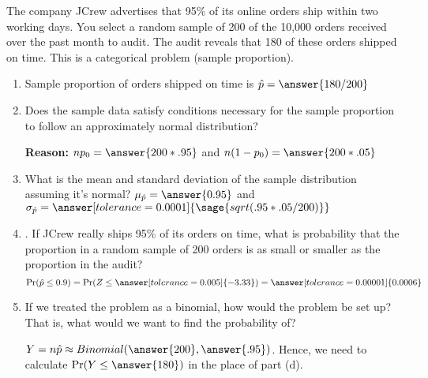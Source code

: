 \documentclass{ximera}
\begin{document}
\begin{problem}
The company JCrew advertises that 95\% of its online orders ship within two working
days. You select a random sample of 200 of the 10,000 orders received over the past month to
audit. The audit reveals that 180 of these orders shipped on time. This is a categorical problem
(sample proportion).
\begin{enumerate}
    \item Sample proportion of orders shipped on time is $\hat p=\answer{180/200}$
 
    \item Does the sample data satisfy conditions necessary for the sample proportion to follow an
approximately normal distribution?
\begin{multipleChoice}
\end{multipleChoice}
{\bf Reason:} $np_0=\answer{200*.95}$
and $n(1-p_0)=\answer{200*.05}$
    
    \item What is the mean and standard deviation of the sample distribution assuming it's normal?
    $\mu_{\hat p}=\answer{0.95}$ and $\sigma_{\hat p}=\answer[tolerance=0.0001]{\sage{sqrt(.95*.05/200)}}$

    \item . If JCrew really ships 95\% of its orders on time, what is probability that the proportion in a
random sample of 200 orders is as small or smaller as the proportion in the audit?
$$\Pr(\hat p \leq 0.9)=\Pr(Z\leq \answer[tolerance=0.005]{-3.33})=\answer[tolerance=0.00001]{0.0006}$$
\item If we treated the problem as a binomial, how would the problem be set up? That is, what
would we want to find the probability of?
\begin{explanation}
$Y=n\hat p \approx Binomial(\answer{200},\answer{.95})$.
Hence, we need to calculate $\Pr(Y\leq \answer{180})$ in the place of part (d). 
\end{explanation}
\end{enumerate}
\end{problem}
\end{document}
